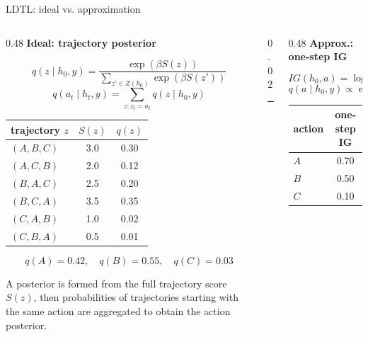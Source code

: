 \documentclass[
11pt,notheorems,hyperref={pdfauthor=whatever}
]{beamer}
\begin{document}
\begin{frame}[t]{LDTL: ideal vs. approximation}
\vspace{0.85em}
\begin{columns}[T,onlytextwidth]
\begin{column}{0.48\textwidth}
{\large\bfseries\textcolor{primary}{Ideal: trajectory posterior}}

\vspace{0.25em}
{\small
\[
q(z \mid h_0, y) =
\frac{\exp(\beta S(z))}
{\sum_{z' \in Z(h_0)} \exp(\beta S(z'))}
\]
\[
q(a_t \mid h_t, y) =
\sum_{z:z_t=a_t} q(z \mid h_0, y)
\]
}

\vspace{-0.55em}
\begin{center}
\scriptsize
\begin{tabular}{lcc}
\toprule
trajectory \(z\) & \(S(z)\) & \(q(z)\) \\
\midrule
\((A,B,C)\) & 3.0 & 0.30 \\
\((A,C,B)\) & 2.0 & 0.12 \\
\((B,A,C)\) & 2.5 & 0.20 \\
\((B,C,A)\) & 3.5 & 0.35 \\
\((C,A,B)\) & 1.0 & 0.02 \\
\((C,B,A)\) & 0.5 & 0.01 \\
\bottomrule
\end{tabular}
\end{center}

\vspace{-0.45em}
{\small
\[
q(A)=0.42,\quad q(B)=0.55,\quad q(C)=0.03
\]
}

{\scriptsize A posterior is formed from the full trajectory score \(S(z)\), then probabilities of trajectories starting with the same action are aggregated to obtain the action posterior.}
\end{column}

\begin{column}{0.02\textwidth}
\centering
\vspace{0.05em}
\rule{0.4pt}{0.70\textheight}
\end{column}

\begin{column}{0.48\textwidth}
{\large\bfseries\textcolor{primary}{Approx.: one-step IG}}

\vspace{0.25em}
{\small
\[
IG(h_0,a)=\log p(y\mid h_0+a)-\log p(y\mid h_0)
\]
\[
q(a\mid h_0,y)\propto \exp(IG(h_0,a)/\tau)
\]
}

\vspace{-0.35em}
\begin{center}
\scriptsize
\begin{tabular}{lc}
\toprule
action & one-step IG \\
\midrule
\(A\) & 0.70 \\
\(B\) & 0.50 \\
\(C\) & 0.10 \\
\bottomrule
\end{tabular}
\end{center}


\end{column}
\end{columns}
\end{frame}
\end{document}

